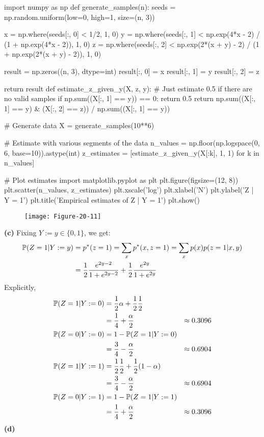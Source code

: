 \begin{python}
import numpy as np
def generate_samples(n):
    seeds = np.random.uniform(low=0, high=1, size=(n, 3))
    
    x = np.where(seeds[:, 0] < 1/2, 1, 0)
    y = np.where(seeds[:, 1] < np.exp(4*x - 2) / (1 + np.exp(4*x - 2)), 1, 0)
    z = np.where(seeds[:, 2] < np.exp(2*(x + y) - 2) / (1 + np.exp(2*(x + y) - 2)), 1, 0)
    
    result = np.zeros((n, 3), dtype=int)
    result[:, 0] = x
    result[:, 1] = y
    result[:, 2] = z
    
    return result
def estimate_z_given_y(X, z, y):
    # Just estimate 0.5 if there are no valid samples
    if np.sum((X[:, 1] == y)) == 0:
        return 0.5
    return np.sum((X[:, 1] == y) & (X[:, 2] == z)) / np.sum((X[:, 1] == y))
\end{python}

\begin{python}
# Generate data
X = generate_samples(10**6)
\end{python}

\begin{python}
# Estimate with various segments of the data
n_values = np.floor(np.logspace(0, 6, base=10)).astype(int)
z_estimates = [estimate_z_given_y(X[:k], 1, 1) for k in n_values]
\end{python}

\begin{python}
# Plot estimates
import matplotlib.pyplot as plt
plt.figure(figsize=(12, 8))
plt.scatter(n_values, z_estimates)
plt.xscale('log')
plt.xlabel('N')
plt.ylabel('Z | Y = 1')
plt.title('Empirical estimates of Z | Y = 1')
plt.show()
\end{python}

\begin{figure}[H]
\centering
\texttt{[image: Figure-20-11]}
\end{figure}

\textbf{(c)}
Fixing \(Y := y \in \{0, 1\}\), we get:
\begin{align*}
\operatorname{\mathbb{P}}(Z = 1 | Y := y) &= p^{*}(z = 1) = \sum_x p^{*}(x, z = 1) = \sum_x p(x) p(z = 1 | x, y) \\
&= \frac{1}{2} \frac{e^{2y-2}}{1 + e^{2y-2}} + \frac{1}{2} \frac{e^{2y}}{1 + e^{2y}}
\end{align*}
Explicitly,
\begin{align*}
\PROB(Z = 1 | Y := 0) &= \frac{1}{2} \alpha + \frac{1}{2}\frac{1}{2} \\
&= \frac{1}{4} + \frac{\alpha}{2} &\approx 0.3096 \\
\PROB(Z = 0 | Y := 0) &= 1 - \PROB(Z = 1 | Y := 0) \\
&= \frac{3}{4} - \frac{\alpha}{2} &\approx 0.6904 \\
\PROB(Z = 1 | Y := 1) &= \frac{1}{2} \frac{1}{2} + \frac{1}{2} \left( 1 - \alpha \right) \\
&= \frac{3}{4} - \frac{\alpha}{2} &\approx 0.6904 \\
\PROB(Z = 0 | Y := 1) &= 1 - \PROB(Z = 1 | Y := 1) \\
&= \frac{1}{4} + \frac{\alpha}{2} &\approx 0.3096
\end{align*}
\textbf{(d)}

